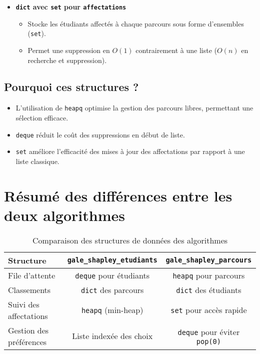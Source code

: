 \documentclass[a4paper,11pt]{article}
\begin{document}
\begin{itemize}
    \item \textbf{\texttt{dict} avec \texttt{set} pour \texttt{affectations}}
    \begin{itemize}
        \item Stocke les étudiants affectés à chaque parcours sous forme d’ensembles (\texttt{set}).
        \item Permet une suppression en $O(1)$ contrairement à une liste ($O(n)$ en recherche et suppression).
    \end{itemize}
\end{itemize}

\subsection{Pourquoi ces structures ?}
\begin{itemize}
    \item L’utilisation de \texttt{heapq} optimise la gestion des parcours libres, permettant une sélection efficace.
    \item \texttt{deque} réduit le coût des suppressions en début de liste.
    \item \texttt{set} améliore l’efficacité des mises à jour des affectations par rapport à une liste classique.
\end{itemize}

\section{Résumé des différences entre les deux algorithmes}

\begin{table}[h]
    \centering
    \begin{tabular}{lcc}
        \toprule
        \textbf{Structure} & \textbf{\texttt{gale\_shapley\_etudiants}} & \textbf{\texttt{gale\_shapley\_parcours}} \\
        \midrule
        File d’attente & \texttt{deque} pour étudiants & \texttt{heapq} pour parcours \\
        Classements & \texttt{dict} des parcours & \texttt{dict} des étudiants \\
        Suivi des affectations & \texttt{heapq} (min-heap) & \texttt{set} pour accès rapide \\
        Gestion des préférences & Liste indexée des choix & \texttt{deque} pour éviter \texttt{pop(0)} \\
        \bottomrule
    \end{tabular}
    \caption{Comparaison des structures de données des algorithmes}
\end{table}
\end{document}
